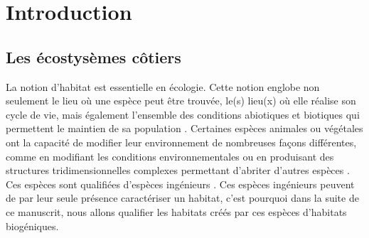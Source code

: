 \hypertarget{introduction}{%
\chapter*{Introduction}\label{introduction}}


\hypertarget{les-uxe9costysuxe8mes-cuxf4tiers}{%
\section*{Les écostysèmes
côtiers}\label{les-uxe9costysuxe8mes-cuxf4tiers}}

La notion d'habitat est essentielle en écologie. Cette notion englobe
non seulement le lieu où une espèce peut être trouvée, le(s) lieu(x) où
elle réalise son cycle de vie, mais également l'ensemble des conditions
abiotiques et biotiques qui permettent le maintien de sa population
\autocite{Hall_1997}. Certaines espèces animales ou végétales ont la
capacité de modifier leur environnement de nombreuses façons
différentes, comme en modifiant les conditions environnementales
\autocite{Ellison_2019} ou en produisant des structures
tridimensionnelles complexes permettant d'abriter d'autres espèces
\autocite{Darling_2017}. Ces espèces sont qualifiées d'espèces
ingénieurs \autocite{Jones_1996}. Ces espèces ingénieurs peuvent de par
leur seule présence caractériser un habitat, c'est pourquoi dans la
suite de ce manuscrit, nous allons qualifier les habitats créés par ces
espèces d'habitats biogéniques.

